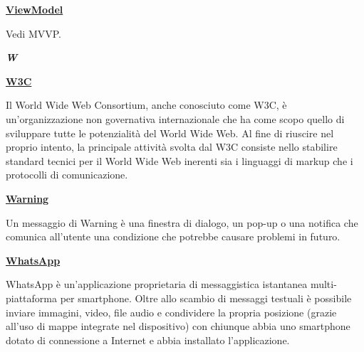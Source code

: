 \begin{addmargin}[0em]{0em}
	\textbf{\underline{ViewModel}}
\end{addmargin}

\medskip
\begin{addmargin}[5em]{1em}
Vedi MVVP.
\end{addmargin}

\cleardoublepage
{}
{}
\noindent\hrulefill\hspace{4mm}\textbf{\textsl{\Huge{W}}}\hspace{4mm}\hrulefill
\vspace*{2\bigskipamount}

\begin{addmargin}[0em]{0em}
	\textbf{\underline{W3C}}
\end{addmargin}

\medskip
\begin{addmargin}[5em]{1em}
Il World Wide Web Consortium, anche conosciuto come W3C, è un'organizzazione non governativa internazionale che ha come scopo quello di sviluppare tutte le potenzialità del World Wide Web. Al fine di riuscire nel proprio intento, la principale attività svolta dal W3C consiste nello stabilire standard tecnici per il World Wide Web inerenti sia i linguaggi di markup che i protocolli di comunicazione.
\end{addmargin}

\bigskip
\begin{addmargin}[0em]{0em}
	\textbf{\underline{Warning}}
\end{addmargin} 

\medskip
\begin{addmargin}[5em]{1em}
Un messaggio di Warning è una finestra di dialogo, un pop-up o una notifica che comunica all'utente una condizione che potrebbe causare problemi in futuro.
\end{addmargin}
	
\bigskip
\begin{addmargin}[0em]{0em}
	\textbf{\underline{WhatsApp}}
\end{addmargin} 

\medskip
\begin{addmargin}[5em]{1em}
WhatsApp è un'applicazione proprietaria di messaggistica istantanea multi-piattaforma per smartphone. Oltre allo scambio di messaggi testuali è possibile inviare immagini, video, file audio e condividere la propria posizione (grazie all'uso di mappe integrate nel dispositivo) con chiunque abbia uno smartphone dotato di connessione a Internet e abbia installato l'applicazione.
\end{addmargin}

